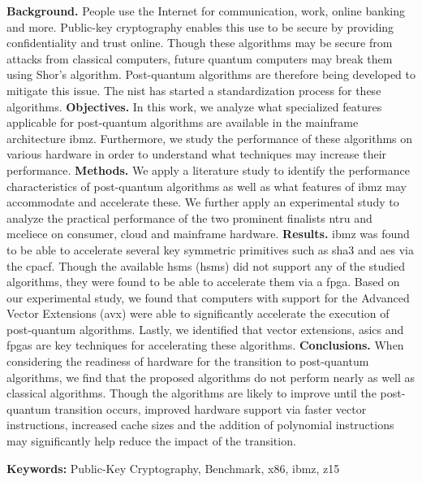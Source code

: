 \abstract
\noindent\textbf{Background.} People use the Internet for communication, work, online banking and more. Public-key cryptography enables this use to be secure by providing confidentiality and trust online. Though these algorithms may be secure from attacks from classical computers, future quantum computers may break them using Shor's algorithm. Post-quantum algorithms are therefore being developed to mitigate this issue. The \acrfull{nist} has started a standardization process for these algorithms.\newline
\textbf{Objectives.} In this work, we analyze what specialized features applicable for \gls{post-quantum} algorithms are available in the mainframe architecture \gls{ibmz}. Furthermore, we study the performance of these algorithms on various hardware in order to understand what techniques may increase their performance.\newline
\textbf{Methods.} We apply a literature study to identify the performance characteristics of \gls{post-quantum} algorithms as well as what features of \gls{ibmz} may accommodate and accelerate these. We further apply an experimental study to analyze the practical performance of the two prominent finalists \gls{ntru} and \gls{mceliece} on consumer, cloud and mainframe hardware.\newline
\textbf{Results.} \gls{ibmz} was found to be able to accelerate several key symmetric primitives such as \gls{sha3} and \gls{aes} via the \gls{cpacf}. Though the available \acrlong{hsm}s (\acrshort{hsm}s) did not support any of the studied algorithms, they were found to be able to accelerate them via a \gls{fpga}. Based on our experimental study, we found that computers with support for the Advanced Vector Extensions (\gls{avx}) were able to significantly accelerate the execution of \gls{post-quantum} algorithms. Lastly, we identified that vector extensions, \glspl{asic} and \glspl{fpga} are key techniques for accelerating these algorithms.\newline
\textbf{Conclusions.} When considering the readiness of hardware for the transition to \gls{post-quantum} algorithms, we find that the proposed algorithms do not perform nearly as well as classical algorithms. Though the algorithms are likely to improve until the \gls{post-quantum} transition occurs, improved hardware support via faster vector instructions, increased cache sizes and the addition of polynomial instructions may significantly help reduce the impact of the transition.

\vspace{1cm}
\noindent
\textbf{Keywords:} Public-Key Cryptography, Benchmark, \gls{x86}, \gls{ibmz}, \gls{z15}

\cleardoublepage